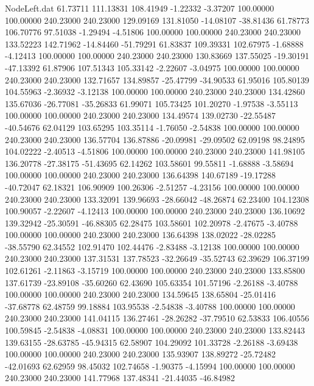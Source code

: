 \begin{filecontents}{NodeLeft.dat}
  61.73711  111.13831  108.41949    -1.22332   -3.37207  100.00000  100.00000  240.23000  240.23000  129.09169  131.81050  -14.08107  -38.81436
  61.78773  106.70776   97.51038    -1.29494   -4.51806  100.00000  100.00000  240.23000  240.23000  133.52223  142.71962  -14.84460  -51.79291
  61.83837  109.39331  102.67975    -1.68888   -4.12413  100.00000  100.00000  240.23000  240.23000  130.83669  137.55025  -19.30191  -47.13392
  61.87906  107.51343  105.33142    -2.22607   -3.04975  100.00000  100.00000  240.23000  240.23000  132.71657  134.89857  -25.47799  -34.90533
  61.95016  105.80139  104.55963    -2.36932   -3.12138  100.00000  100.00000  240.23000  240.23000  134.42860  135.67036  -26.77081  -35.26833
  61.99071  105.73425  101.20270    -1.97538   -3.55113  100.00000  100.00000  240.23000  240.23000  134.49574  139.02730  -22.55487  -40.54676
  62.04129  103.65295  103.35114    -1.76050   -2.54838  100.00000  100.00000  240.23000  240.23000  136.57704  136.87886  -20.09981  -29.09502
  62.09198   98.24895  104.02222    -2.40513   -4.51806  100.00000  100.00000  240.23000  240.23000  141.98105  136.20778  -27.38175  -51.43695
  62.14262  103.58601   99.55811    -1.68888   -3.58694  100.00000  100.00000  240.23000  240.23000  136.64398  140.67189  -19.17288  -40.72047
  62.18321  106.90909  100.26306    -2.51257   -4.23156  100.00000  100.00000  240.23000  240.23000  133.32091  139.96693  -28.66042  -48.26874
  62.23400  104.12308  100.90057    -2.22607   -4.12413  100.00000  100.00000  240.23000  240.23000  136.10692  139.32942  -25.30591  -46.88305
  62.28475  103.58601  102.20978    -2.47675   -3.40788  100.00000  100.00000  240.23000  240.23000  136.64398  138.02022  -28.02285  -38.55790
  62.34552  102.91470  102.44476    -2.83488   -3.12138  100.00000  100.00000  240.23000  240.23000  137.31531  137.78523  -32.26649  -35.52743
  62.39629  106.37199  102.61261    -2.11863   -3.15719  100.00000  100.00000  240.23000  240.23000  133.85800  137.61739  -23.89108  -35.60260
  62.43690  105.63354  101.57196    -2.26188   -3.40788  100.00000  100.00000  240.23000  240.23000  134.59645  138.65804  -25.01416  -37.68778
  62.48759   99.18884  103.95538    -2.54838   -3.40788  100.00000  100.00000  240.23000  240.23000  141.04115  136.27461  -28.26282  -37.79510
  62.53833  106.40556  100.59845    -2.54838   -4.08831  100.00000  100.00000  240.23000  240.23000  133.82443  139.63155  -28.63785  -45.94315
  62.58907  104.29092  101.33728    -2.26188   -3.69438  100.00000  100.00000  240.23000  240.23000  135.93907  138.89272  -25.72482  -42.01693
  62.62959   98.45032  102.74658    -1.90375   -4.15994  100.00000  100.00000  240.23000  240.23000  141.77968  137.48341  -21.44035  -46.84982

\end{filecontents}
